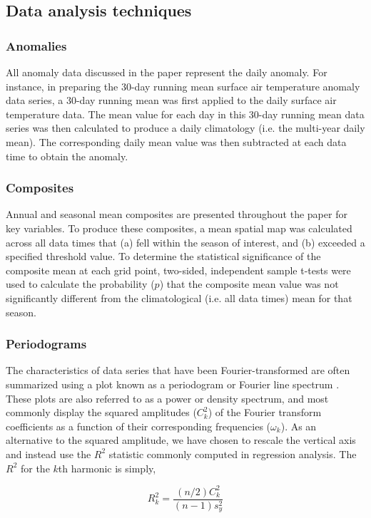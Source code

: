 \subsection{Data analysis techniques}

\subsubsection{Anomalies}
All anomaly data discussed in the paper represent the daily anomaly. For instance, in preparing the 30-day running mean surface air temperature anomaly data series, a 30-day running mean was first applied to the daily surface air temperature data. The mean value for each day in this 30-day running mean data series was then calculated to produce a daily climatology (i.e. the multi-year daily mean). The corresponding daily mean value was then subtracted at each data time to obtain the anomaly.  

\subsubsection{Composites}
Annual and seasonal mean composites are presented throughout the paper for key variables. To produce these composites, a mean spatial map was calculated across all data times that (a) fell within the season of interest, and (b) exceeded a specified threshold value. To determine the statistical significance of the composite mean at each grid point, two-sided, independent sample t-tests were used to calculate the probability ($p$) that the composite mean value was not significantly different from the climatological (i.e. all data times) mean for that season.

\subsubsection{Periodograms}
The characteristics of data series that have been Fourier-transformed are often summarized using a plot known as a periodogram or Fourier line spectrum \citep{Wilks2011}. These plots are also referred to as a power or density spectrum, and most commonly display the squared amplitudes ($C_k^2$) of the Fourier transform coefficients as a function of their corresponding frequencies ($\omega_k$). As an alternative to the squared amplitude, we have chosen to rescale the vertical axis and instead use the $R^2$ statistic commonly computed in regression analysis. The $R^2$ for the $k$th harmonic is simply,

\begin{equation}\label{eq:variance_explained}
R_k^2 = \frac{(n/2)C_k^2}{(n-1)s_y^2}
\end{equation}

